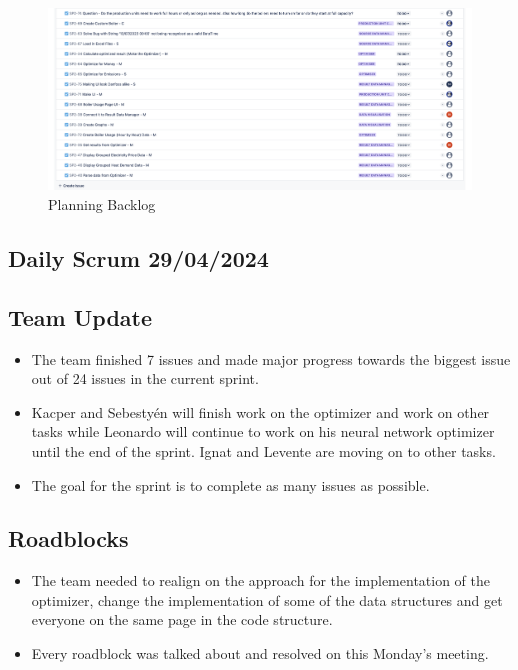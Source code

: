 \documentclass[12pt]{report}
\begin{document}
\begin{figure}[H]
  \centering
  \includegraphics[width=1\textwidth]{Resources/4-Sprint/Planning/Jira.png}
  \caption{Planning Backlog}
  \label{fig:S4Planning-image}
\end{figure}
\clearpage


\subsection*{Daily Scrum 29/04/2024}
\subsection*{Team Update}
\begin{itemize}
    \item The team finished 7 issues and made major progress towards the biggest issue out of 24 issues in the current sprint.
    \item Kacper and Sebestyén will finish work on the optimizer and work on other tasks while Leonardo will continue to work on his neural network optimizer until the end of the sprint. Ignat and Levente are moving on to other tasks.
    \item The goal for the sprint is to complete as many issues as possible.
\end{itemize}

\subsection*{Roadblocks}
\begin{itemize}
    \item The team needed to realign on the approach for the implementation of the optimizer, change the implementation of some of the data structures and get everyone on the same page in the code structure.
    \item Every roadblock was talked about and resolved on this Monday’s meeting.
\end{itemize}
\end{document}
